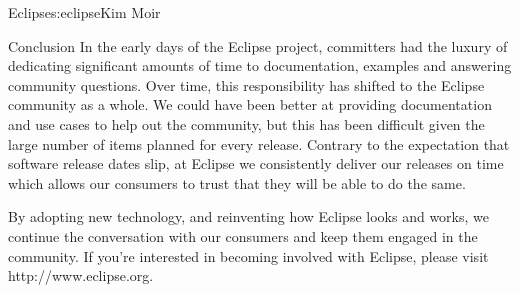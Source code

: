 \begin{aosachapter}{Eclipse}{s:eclipse}{Kim Moir}
\begin{aosasect1}{Conclusion}
In the early days of the Eclipse project, committers had the luxury of
dedicating significant amounts of time to documentation, examples and
answering community questions. Over time, this responsibility has
shifted to the Eclipse community as a whole.  We could have been
better at providing documentation and use cases to help out the
community, but this has been difficult given the large number of items
planned for every release.  Contrary to the expectation that software
release dates slip, at Eclipse we consistently deliver our releases on
time which allows our consumers to trust that they will be able to do
the same.

By adopting new technology, and reinventing how Eclipse looks and
works, we continue the conversation with our consumers and keep
them engaged in the community. If you're interested in becoming
involved with Eclipse, please visit http://www.eclipse.org.
\end{aosasect1}

\end{aosachapter}
